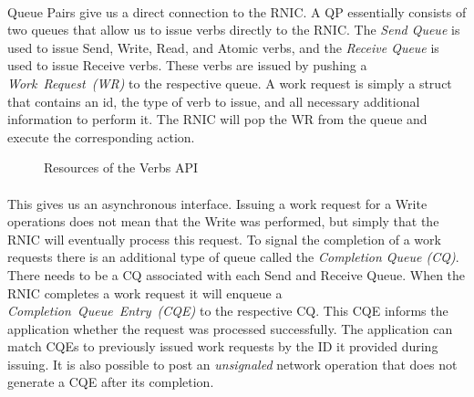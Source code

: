 \paragraph{} Queue Pairs give us a direct connection to the RNIC. A QP essentially consists of two queues that allow us to 
issue verbs directly to the RNIC. The \emph{Send Queue} is used to issue Send, Write, Read, and Atomic verbs, and the 
\emph{Receive Queue} is used to issue  Receive verbs. These verbs are issued by pushing a \mbox{\emph{Work Request~(WR)}}
to the respective queue. A work request is simply a struct that contains an id, the type of verb to issue, and all necessary 
additional information to perform it. The RNIC will pop the WR from the queue and execute the corresponding action.

\begin{figure}[!ht]
\begin{center}
\end{center}
\caption{Resources of the Verbs API}
\label{fig:rdma-parts}
\end{figure}


\paragraph{} This gives us an asynchronous interface. Issuing a work request for a Write operations
does not mean that the Write was
performed, but simply that the RNIC will eventually process this request. To signal the completion of a
work requests there
is an additional type of queue called the \emph{Completion Queue (CQ)}. There needs to be a CQ associated with each Send and 
Receive Queue. When the RNIC completes a work request it will enqueue a \mbox{\emph{Completion Queue Entry~(CQE)}} to the respective
CQ. This CQE informs the application whether the request was processed successfully. The application can match CQEs to 
previously issued work requests by the ID it provided during issuing. It is also possible to post an \emph{unsignaled} network
operation that does not generate a CQE after its completion.


